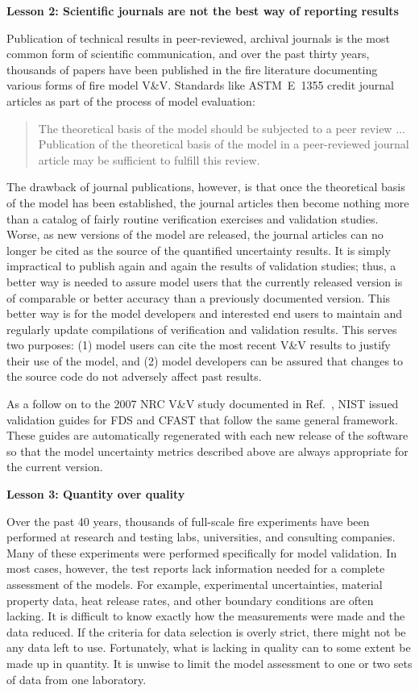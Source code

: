 \documentclass[fleqn,b5paper]{article}
\begin{document}
\vspace{\parskip}
{\bf Lesson 2: Scientific journals are not the best way of reporting results}

Publication of technical results in peer-reviewed, archival journals is the most common form of scientific communication, and over the past thirty years, thousands of papers have been published in the fire literature documenting various forms of fire model V\&V. Standards like ASTM~E~1355 credit journal articles as part of the process of model evaluation:
\begin{quote}
The theoretical basis of the model should be subjected to a peer review $\ldots$ Publication of the theoretical basis of the model in a peer-reviewed journal article may be sufficient to fulfill this review.
\end{quote}
The drawback of journal publications, however, is that once the theoretical basis of the model has been established, the journal articles then become nothing more than a catalog of fairly routine verification exercises and validation studies. Worse, as new versions of the model are released, the journal articles can no longer be cited as the source of the quantified uncertainty results. It is simply impractical to publish again and again the results of validation studies; thus, a better way is needed to assure model users that the currently released version is of comparable or better accuracy than a previously documented version. This better way is for the model developers and interested end users to maintain and regularly update compilations of verification and validation results. This serves two purposes: (1) model users can cite the most recent V\&V results to justify their use of the model, and (2) model developers can be assured that changes to the source code do not adversely affect past results.

As a follow on to the 2007 NRC V\&V study documented in Ref.~\cite{NUREG_1824}, NIST issued validation guides for FDS and CFAST that follow the same general framework. These guides are automatically regenerated with each new release of the software so that the model uncertainty metrics described above are always appropriate for the current version.

\vspace{\parskip}
{\bf Lesson 3: Quantity over quality}

Over the past 40 years, thousands of full-scale fire experiments have been performed at research and testing labs, universities, and consulting companies. Many of these experiments were performed specifically for model validation. In most cases, however, the test reports lack information needed for a complete assessment of the models. For example, experimental uncertainties, material property data, heat release rates, and other boundary conditions are often lacking. It is difficult to know exactly how the measurements were made and the data reduced. If the criteria for data selection is overly strict, there might not be any data left to use. Fortunately, what is lacking in quality can to some extent be made up in quantity. It is unwise to limit the model assessment to one or two sets of data from one laboratory.
\end{document}
